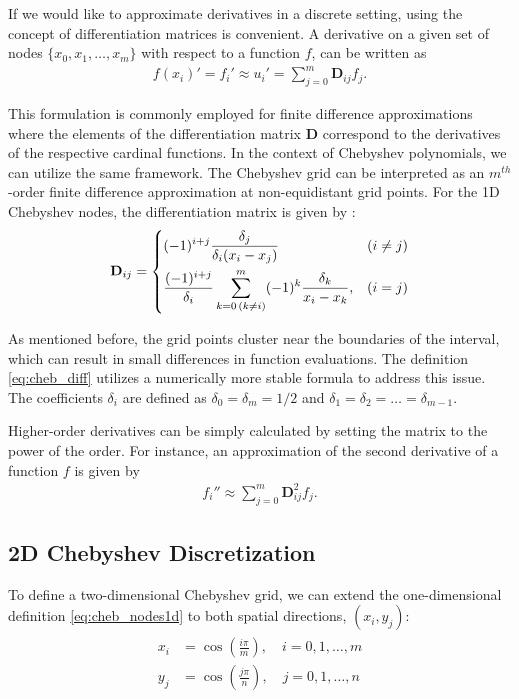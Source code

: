 If we would like to approximate derivatives in a discrete setting, using the
concept of differentiation matrices is convenient. A derivative on a given set
of nodes $\{x_0, x_1,\dots, x_m\}$ with respect to a function $f$, can be written
as
\begin{align}
f(x_i)' = f_i' \approx u_i' = \sum_{j=0}^{m}\mathbf{D}_{ij}f_j.
\end{align}

This formulation is commonly employed for finite difference approximations
where the elements of the differentiation matrix $\mathbf{D}$ correspond to the
derivatives of the respective cardinal functions. In the context of Chebyshev
polynomials, we can utilize the same framework. The Chebyshev grid can be
interpreted as an $m^{th}$-order finite difference approximation at
non-equidistant grid points. For the 1D Chebyshev nodes, the differentiation
matrix is given by \citep{meseguer2020}:
\begin{align}
\mathbf{D}_{ij} =
\begin{dcases}
  (-1)^{i+j} \frac{\delta_j}{\delta_i(x_i - x_j)}
    & (i \neq j) \\
  \frac{(-1)^{i+j}}{\delta_i} \sum^{m}_{k=0 \, (k \neq i)}
    (-1)^{k} \frac{\delta_k}{x_i - x_k}, & (i = j)
\end{dcases}
\label{eq:cheb_diff}
\end{align}

As mentioned before, the grid points cluster near the boundaries of the
interval, which can result in small differences in function evaluations. The
definition \eqref{eq:cheb_diff} utilizes a numerically more stable formula to
address this issue. The coefficients $\delta_i$ are defined as $\delta_0 =
\delta_m = 1/2$ and $\delta_1 = \delta_2 = \dots = \delta_{m-1}$.

Higher-order derivatives can be simply calculated by setting the matrix to the
power of the order. For instance, an approximation of the second derivative of
a function $f$ is given by
\begin{align}
  f_i'' \approx \sum_{j=0}^{m}\mathbf{D}_{ij}^{2}f_j.
\end{align}

\subsection{2D Chebyshev Discretization} \label{sec:2d_cheb}

To define a two-dimensional Chebyshev grid, we can extend the one-dimensional
definition \eqref{eq:cheb_nodes1d} to both spatial directions, $(x_i, y_j)$:
\vspace{-10pt}
\begin{align} \label{eq:cheb_nodes2d}
  \begin{split}
  x_i & = \cos(\frac{i \pi}{m}), \quad i = 0,1,\dots,m \\ 
  y_j &  = \cos(\frac{j \pi}{n}), \quad j = 0,1,\dots,n
  \end{split}
\end{align}

